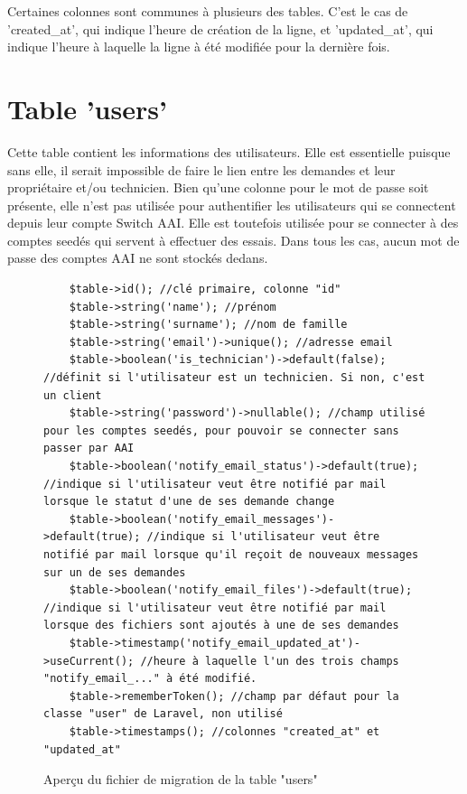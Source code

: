 \documentclass[
    iai, %
    eai, %
]{heig-tb}
\begin{document}
Certaines colonnes sont communes à plusieurs des tables. C'est le cas de 'created\_at', qui indique l'heure de création de la ligne, et 'updated\_at', qui indique l'heure à laquelle la ligne à été modifiée pour la dernière fois.

\section{Table 'users'}
Cette table contient les informations des utilisateurs. Elle est essentielle puisque sans elle, il serait impossible de faire le lien entre les demandes et leur propriétaire et/ou technicien.
Bien qu'une colonne pour le mot de passe soit présente, elle n'est pas utilisée pour authentifier les utilisateurs qui se connectent depuis leur compte Switch AAI. Elle est toutefois utilisée pour se connecter à des comptes seedés qui servent à effectuer des essais. Dans tous les cas, aucun mot de passe des comptes AAI ne sont stockés dedans.

\begin{figure}[h]
  \begin{verbatim}
    $table->id(); //clé primaire, colonne "id"
    $table->string('name'); //prénom
    $table->string('surname'); //nom de famille
    $table->string('email')->unique(); //adresse email
    $table->boolean('is_technician')->default(false); //définit si l'utilisateur est un technicien. Si non, c'est un client
    $table->string('password')->nullable(); //champ utilisé pour les comptes seedés, pour pouvoir se connecter sans passer par AAI
    $table->boolean('notify_email_status')->default(true); //indique si l'utilisateur veut être notifié par mail lorsque le statut d'une de ses demande change
    $table->boolean('notify_email_messages')->default(true); //indique si l'utilisateur veut être notifié par mail lorsque qu'il reçoit de nouveaux messages sur un de ses demandes
    $table->boolean('notify_email_files')->default(true); //indique si l'utilisateur veut être notifié par mail lorsque des fichiers sont ajoutés à une de ses demandes
    $table->timestamp('notify_email_updated_at')->useCurrent(); //heure à laquelle l'un des trois champs "notify_email_..." à été modifié.
    $table->rememberToken(); //champ par défaut pour la classe "user" de Laravel, non utilisé
    $table->timestamps(); //colonnes "created_at" et "updated_at"
  \end{verbatim}
  \caption{Aperçu du fichier de migration de la table "users"}
\end{figure}
\end{document}
